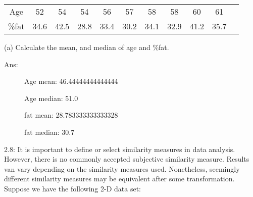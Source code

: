 	\vspace{0.5\baselineskip}

	\begin{center}
	\begin{tabular}{ |c|c|c|c|c|c|c|c|c|c|c| } 
	\hline
	
	Age & 52 & 54 & 54 & 56 & 57 & 58 & 58 & 60 & 61 \\ 
	\%fat & 34.6 & 42.5 & 28.8 & 33.4 & 30.2 & 34.1 & 32.9 & 41.2 & 35.7 \\ 
	
	\hline
	\end{tabular}
	\end{center}

	\begin{description}


		\item (a) Calculate the mean, and median of age and \%fat.

		\vspace{0.5\baselineskip}
	
	\end{description}

	Ans:
	

	\begin{description}
		
		\item[\hspace{1cm}] Age mean: 46.44444444444444
		\item[\hspace{1cm}] Age median: 51.0

		\vspace{0.5\baselineskip}

		\item[\hspace{1cm}] fat mean: 28.783333333333328
		\item[\hspace{1cm}] fat median: 30.7
		
	\end{description}
	

	\vspace{0.5\baselineskip}

	\clearpage

	2.8: It is important to define or select similarity measures in data analysis.
	However, there is no commonly accepted subjective similarity measure.
	Results van vary depending on the similarity measures used.
	Nonetheless, seemingly different similarity measures may be equivalent after some transformation.
	Suppose we have the following 2-D data set:

